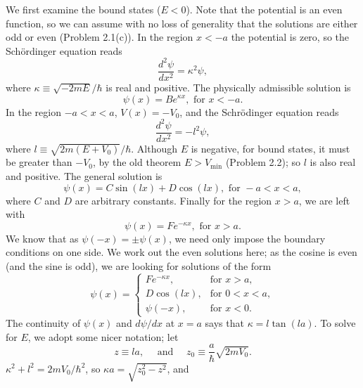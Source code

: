\documentclass{article}
\begin{document}
We first examine the bound states ($E < 0$). Note that the potential is an
even function, so we can assume with no loss of generality that the solutions
are either odd or even (Problem 2.1(c)). In the region $x < -a$ the potential
is zero, so the Sch\"{o}rdinger equation reads
\begin{equation} \label{eq:fin-sq-well-bou-1}
  \frac{d^2\psi}{dx^2} = \kappa^2\psi,
\end{equation}
where $\kappa \equiv \sqrt{-2mE}/\hbar$ is real and positive. The physically
admissible solution is
\begin{equation} \label{eq:fin-sq-well-bou-2}
  \psi(x) = Be^{\kappa x}, \text{ for } x < -a.
\end{equation}
In the region $-a < x < a$, $V(x) = -V_0$, and the Schr\"{o}dinger equation
reads
\begin{equation} \label{eq:fin-sq-well-bou-3}
  \frac{d^2\psi}{dx^2} = -l^2\psi,
\end{equation}
where $l \equiv \sqrt{2m(E + V_0)}/\hbar$. Although $E$ is negative, for bound
states, it must be greater than $-V_0$, by the old theorem $E > V_{\min}$
(Problem 2.2); so $l$ is also real and positive. The general solution is
\begin{equation} \label{eq:fin-sq-well-bou-4}
  \psi(x) = C\sin(lx) + D\cos(lx), \text{ for } -a < x < a,
\end{equation}
where $C$ and $D$ are arbitrary constants. Finally for the region $x > a$, we
are left with
\begin{equation} \label{eq:fin-sq-well-bou-5}
  \psi(x) = Fe^{-\kappa x}, \text{ for } x > a.
\end{equation}
We know that as $\psi(-x) = \pm\psi(x)$, we need only impose the boundary
conditions on one side. We work out the even solutions here; as the cosine is
even (and the sine is odd), we are looking for solutions of the form
\begin{equation} \label{eq:fin-sq-well-bou-6}
  \psi(x) =
  \begin{cases}
    Fe^{-\kappa x}, &\text{for } x > a, \\
    D\cos(lx), &\text{for } 0 < x < a, \\
    \psi(-x), &\text{for } x < 0.
  \end{cases}
\end{equation}
The continuity of $\psi(x)$ and $d\psi/dx$ at $x = a$ says that $\kappa =
l\tan(la)$. To solve for $E$, we adopt some nicer notation; let \[
  z \equiv la, \quad \text{ and } \quad z_0 \equiv \frac{a}{\hbar}\sqrt{2mV_0}.
\] $\kappa^2 + l^2 = 2mV_0/\hbar^2$, so $\kappa a = \sqrt{z_0^2 - z^2}$, and
\end{document}
